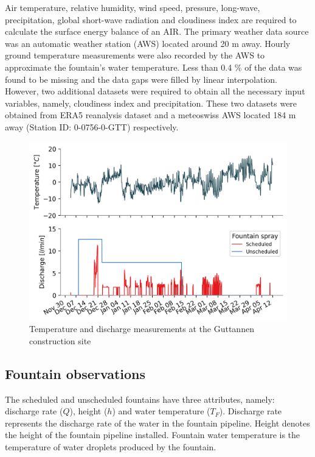 \documentclass[tc, manuscript]{copernicus}
\begin{document}
Air temperature, relative humidity, wind speed, pressure, long-wave, precipitation, global short-wave radiation
and cloudiness index are required to calculate the surface energy balance of an AIR. The primary weather data
source was an automatic weather station (AWS) located around 20 m away. Hourly ground temperature measurements
were also recorded by the AWS to approximate the fountain's water temperature. Less than 0.4 \% of the data was
found to be missing and the data gaps were filled by linear interpolation. However, two additional datasets were
required to obtain all the necessary input variables, namely, cloudiness index and precipitation. These two
datasets were obtained from ERA5 reanalysis dataset \citep{hersbachERA5GlobalReanalysis2020} and a meteoswiss AWS
located 184 m away (Station ID: 0-0756-0-GTT) respectively.

\begin{figure}[t]
\includegraphics[width=12cm]{Figures/disvstemp.png}
\caption{Temperature and discharge measurements at the Guttannen construction site}
\label{fig:aws} 
\end{figure}

\subsection{Fountain observations}

The scheduled and unscheduled fountains have three attributes, namely: discharge rate ($Q$), height ($h$) and
water temperature ($T_F$). Discharge rate represents the discharge rate of the water in the fountain pipeline.
Height denotes the height of the fountain pipeline installed. Fountain water temperature is the temperature of
water droplets produced by the fountain.
\end{document}
